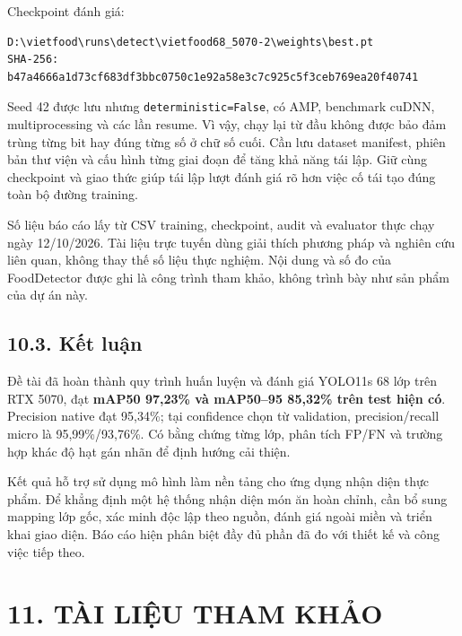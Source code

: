 \documentclass[
  vietnamese,
  12pt,
  a4paper,
]{article}
\begin{document}
Checkpoint đánh giá:

\begin{Verbatim}[breaklines=true,breakanywhere=true,fontsize=\footnotesize,baselinestretch=1]
D:\vietfood\runs\detect\vietfood68_5070-2\weights\best.pt
SHA-256: b47a4666a1d73cf683df3bbc0750c1e92a58e3c7c925c5f3ceb769ea20f40741
\end{Verbatim}

Seed 42 được lưu nhưng
\texttt{d\allowbreak{}e\allowbreak{}t\allowbreak{}e\allowbreak{}r\allowbreak{}m\allowbreak{}i\allowbreak{}n\allowbreak{}i\allowbreak{}s\allowbreak{}t\allowbreak{}i\allowbreak{}c\allowbreak{}=\allowbreak{}F\allowbreak{}a\allowbreak{}l\allowbreak{}s\allowbreak{}e\allowbreak{}},
có AMP, benchmark cuDNN, multiprocessing và các lần resume. Vì vậy, chạy
lại từ đầu không được bảo đảm trùng từng bit hay đúng từng số ở chữ số
cuối. Cần lưu dataset manifest, phiên bản thư viện và cấu hình từng giai
đoạn để tăng khả năng tái lập. Giữ cùng checkpoint và giao thức giúp tái
lập lượt đánh giá rõ hơn việc cố tái tạo đúng toàn bộ đường training.

Số liệu báo cáo lấy từ CSV training, checkpoint, audit và evaluator thực
chạy ngày 12/10/2026. Tài liệu trực tuyến dùng giải thích phương pháp và
nghiên cứu liên quan, không thay thế số liệu thực nghiệm. Nội dung và số
đo của FoodDetector được ghi là công trình tham khảo, không trình bày
như sản phẩm của dự án này.

\subsection{10.3. Kết luận}\label{kux1ebft-luux1eadn}

Đề tài đã hoàn thành quy trình huấn luyện và đánh giá YOLO11s 68 lớp
trên RTX 5070, đạt \textbf{mAP50 97,23\% và mAP50--95 85,32\% trên test
hiện có}. Precision native đạt 95,34\%; tại confidence chọn từ
validation, precision/recall micro là 95,99\%/93,76\%. Có bằng chứng
từng lớp, phân tích FP/FN và trường hợp khác độ hạt gán nhãn để định
hướng cải thiện.

Kết quả hỗ trợ sử dụng mô hình làm nền tảng cho ứng dụng nhận diện thực
phẩm. Để khẳng định một hệ thống nhận diện món ăn hoàn chỉnh, cần bổ
sung mapping lớp gốc, xác minh độc lập theo nguồn, đánh giá ngoài miền
và triển khai giao diện. Báo cáo hiện phân biệt đầy đủ phần đã đo với
thiết kế và công việc tiếp theo.

\section{11. TÀI LIỆU THAM KHẢO}\label{tuxe0i-liux1ec7u-tham-khux1ea3o}
\end{document}
